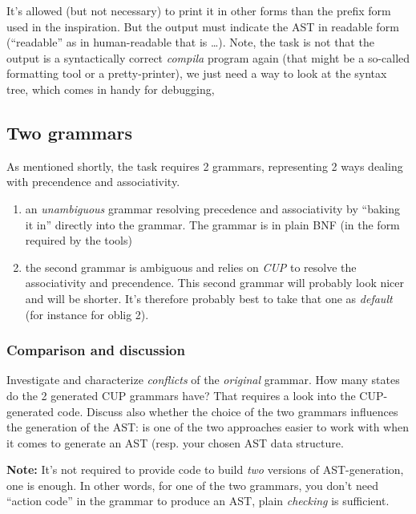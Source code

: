 \documentclass[10pt,freeform]{handout}[2014/08/13]
\begin{document}
It's allowed (but not necessary) to print it in other forms than the prefix
form used in the inspiration. But the output must indicate the AST in
readable form (``readable'' as in human-readable that is \ldots). Note, the
task is not that the output is a syntactically correct \textsl{compila}
program again (that might be a so-called formatting tool or a
pretty-printer), we just need a way to look at the syntax tree, which comes
in handy for debugging,


%
% 

\subsection{Two grammars}
\label{sec:two-grammars}


As mentioned shortly, the task requires 2 grammars, representing 2 ways
dealing with precendence and associativity.

\begin{enumerate}
\item an \emph{unambiguous} grammar resolving precedence and associativity
  by ``baking it in'' directly into the grammar. The grammar is in plain
  BNF (in the form required by the tools)
\item the second grammar is ambiguous and relies on \emph{CUP} to resolve
  the associativity and precendence. This second grammar will probably look
  nicer and will be shorter. It's therefore probably best to take that one
  as \emph{default} (for instance for oblig 2).
\end{enumerate}

\subsubsection*{Comparison and discussion}
\label{sec:comparison}

Investigate and characterize \emph{conflicts} of the \emph{original}
grammar. How many states do the 2 generated CUP grammars have? That
requires a look into the CUP-generated code. Discuss also whether the
choice of the two grammars influences the generation of the AST: is one of
the two approaches easier to work with when it comes to generate an AST
(resp. your chosen AST data structure.


\textbf{Note:} It's not required to provide code to build \emph{two}
versions of AST-generation, one is enough. In other words, for one of the
two grammars, you don't need ``action code'' in the grammar to produce an
AST, plain \emph{checking} is sufficient.
\end{document}
